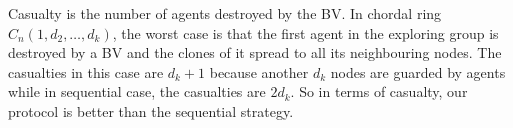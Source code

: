
Casualty is the number of agents destroyed by the BV. In chordal ring $C_n(1, d_2,\dots, d_k)$, the worst case is that the first agent in the exploring group is destroyed by a BV and the clones of it spread to all its neighbouring nodes. The casualties in this case are $d_k+1$ because another $d_k$ nodes are guarded by agents while in sequential case, the casualties are $2d_k$. So in terms of casualty, our protocol is better than the sequential strategy.






